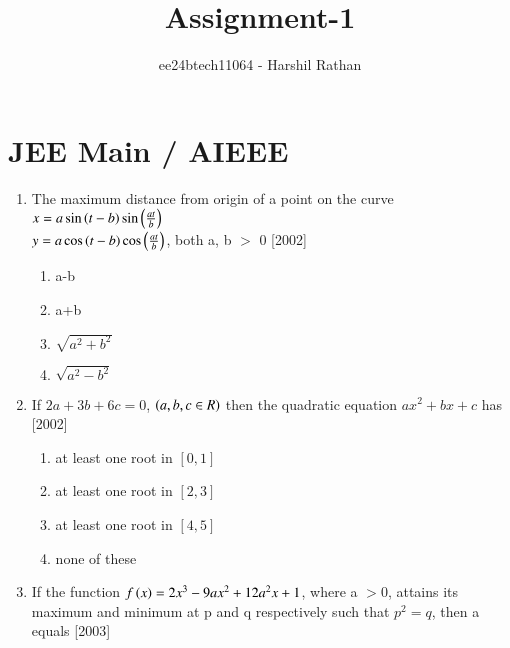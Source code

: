 \documentclass[journal,12pt,twocolumn]{IEEEtran}
\theoremstyle{remark}
\begin{document}

\vspace{3cm}

\title{Assignment-1}
\author{ee24btech11064 - Harshil Rathan}
\maketitle
\newpage
\bigskip

\renewcommand{\thefigure}{\theenumi}
\renewcommand{\thetable}{\theenumi}
\section{JEE Main / AIEEE}
\begin{enumerate}
\item The maximum distance from origin of a point on the curve\\ $x = a \sin\left(t-b\right) \sin\left(\frac{at}{b}\right)$\\ $y = a \cos\left(t-b\right) \cos\left(\frac{at}{b}\right)$, both a, b $>$ 0 \hfill{[2002]}
\begin{multicols}{2}
\begin{enumerate}
    \item a-b
        \item a+b
	    \item $\sqrt{a^2+b^2}$
	        \item $\sqrt{a^2-b^2}$
		\end{enumerate}
		\end{multicols}
		\item If $2a+3b+6c=0$, $\left(a,b,c \in R\right)$ then the quadratic equation $ax^2+bx+c$ has \hfill{[2002]}
		\begin{multicols}{2}
		\begin{enumerate}
		    \item at least one root in $[0,1]$
		        \item at  least one root in $[2,3]$
			    \item at least one root in $[4,5]$
			        \item none of these \\
				\end{enumerate}
				\end{multicols}
				\item If the function $f\left(x\right)=2x^3-9ax^2+12a^2x+1$, where a $>$0, attains its maximum and minimum at p and q respectively such that $p
				    ^2=q$, then a equals  \hfill{[2003]}
				    \begin{multicols}{2}
				    \begin{enumerate}

\end{enumerate}
\end{multicols}
\end{enumerate}
\end{document}
